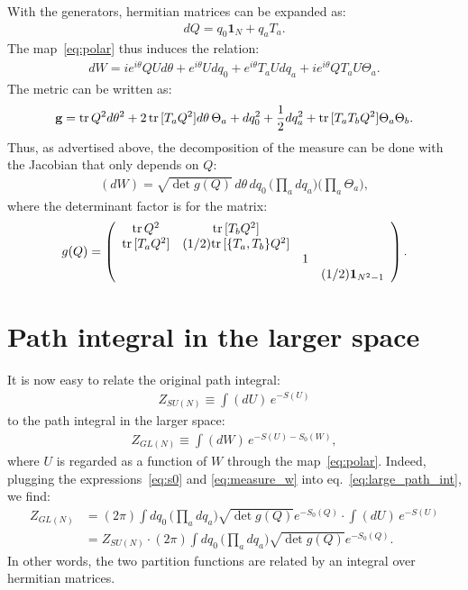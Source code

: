 \documentclass[12pt]{article}
\begin{document}
With the generators,
hermitian matrices can be expanded as:
\begin{align}
  dQ = q_0 \textbf{1}_N + q_a T_a.
\end{align}
The map~\eqref{eq:polar} thus induces the relation:
\begin{align}
  dW
  =
  i e^{i\theta} Q U d\theta
  +
  e^{i\theta} U dq_0
  +
  e^{i\theta} T_a U dq_a
  +
  i e^{i\theta} Q T_a U \Theta_a.
  \label{eq:expand_dw}
\end{align}
The metric can be written as:
\begin{align}
  \textbf{g}
  =
  {\rm tr}\, Q^2  d\theta^2
  +
  2 \, {\rm tr}\,[T_a Q^2] d\theta \, \Theta_a
  +
  dq_0^2
  +
  \frac{1}{2} dq_a^2
  +
  {\rm tr}\, [T_a T_b Q^2]  \Theta_a \Theta_b.
\end{align}
Thus, as advertised above,
the decomposition of the measure can be done with the
Jacobian that only depends on $Q$:
\begin{align}
  (dW)
  =
  \sqrt{\det g(Q)}
  \,
  d\theta
  \,
  dq_0
  \,
  \Big(\prod_a dq_a\Big)
  \Big(\prod_a \Theta_a \Big),
  \label{eq:measure_w}
\end{align}
where the determinant factor is for the matrix:
\begin{align}
  g(Q) =
  \left(
  \begin{array}{c c c c}
    {\rm tr}\, Q^2 & {\rm tr}\,[T_b Q^2] & & \\
    {\rm tr}\,[T_a Q^2] & (1/2){\rm tr}\,[\{T_a, T_b\} Q^2] & & \\
                   && 1 & \\
                   && & (1/2)\textbf{1}_{N^2-1}
  \end{array}
  \right).
\end{align}


\section{Path integral in the larger space}
\label{sec:path_integral}

It is now easy to relate the original path integral:
\begin{align}
  Z_{SU(N)}
  \equiv
  \int(dU)\,
  e^{-S(U)}
\end{align}
to the path integral in the larger space:
\begin{align}
  Z_{GL(N)}
  \equiv
  \int (dW)\,
  e^{ - S(U)- S_0(W)},
  \label{eq:large_path_int}
\end{align}
where $U$ is regarded as a function of $W$ through the map~\eqref{eq:polar}.
Indeed, plugging the expressions~\eqref{eq:s0} and \eqref{eq:measure_w}
into eq.~\eqref{eq:large_path_int}, we find:
\begin{align}
  Z_{GL(N)}
  &=
    (2\pi)
    \int
    dq_0
    \,
    \Big(\prod_a dq_a\Big)
    \sqrt{\det g(Q)}
    e^{-S_0(Q)}
    \cdot
    \int
    (dU)\, e^{-S(U)} \nonumber \\
  &=
    Z_{SU(N)}
    \cdot
    (2\pi)
    \int
    dq_0
    \,
    \Big(\prod_a dq_a\Big)
    \sqrt{\det g(Q)}
    e^{-S_0(Q)}.
\end{align}
In other words,
the two partition functions are related by
an integral over hermitian matrices.
\end{document}
